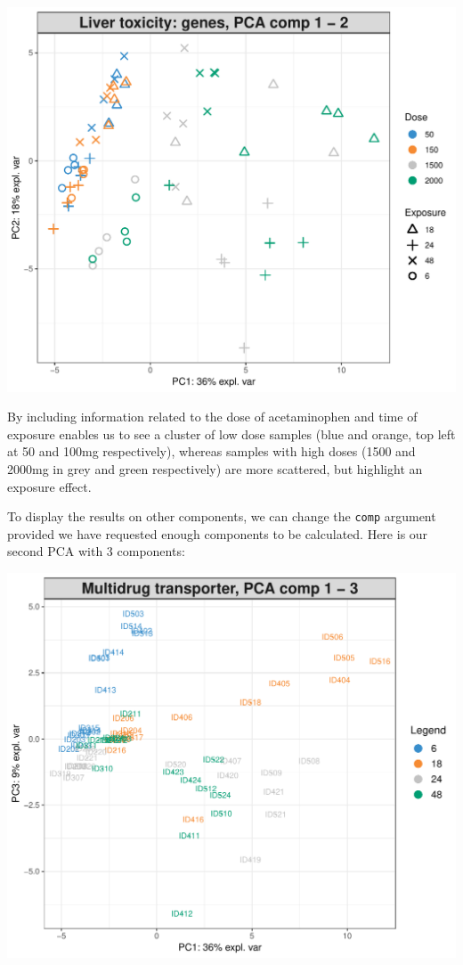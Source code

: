 \documentclass[]{book}
\newenvironment{Shaded}{\begin{snugshade}}{\end{snugshade}}
\newcommand{\DataTypeTok}[1]{\textcolor[rgb]{0.13,0.29,0.53}{#1}}
\newcommand{\DecValTok}[1]{\textcolor[rgb]{0.00,0.00,0.81}{#1}}
\newcommand{\KeywordTok}[1]{\textcolor[rgb]{0.13,0.29,0.53}{\textbf{#1}}}
\newcommand{\NormalTok}[1]{#1}
\newcommand{\OperatorTok}[1]{\textcolor[rgb]{0.81,0.36,0.00}{\textbf{#1}}}
\newcommand{\OtherTok}[1]{\textcolor[rgb]{0.56,0.35,0.01}{#1}}
\newcommand{\StringTok}[1]{\textcolor[rgb]{0.31,0.60,0.02}{#1}}
\begin{document}
\begin{center}\includegraphics[width=0.5\linewidth,]{Figures/03-pca-liver-1-plot-1} \end{center}

By including information related to the dose of acetaminophen and time of exposure enables us to see a cluster of low dose samples (blue and orange, top left at 50 and 100mg respectively), whereas samples with high doses (1500 and 2000mg in grey and green respectively) are more scattered, but highlight an exposure effect.

To display the results on other components, we can change the \texttt{comp} argument provided we have requested enough components to be calculated. Here is our second PCA with 3 components:

\begin{Shaded}
\end{Shaded}

\begin{center}\includegraphics[width=0.5\linewidth,]{Figures/03-pca-liver-2-1} \end{center}
\end{document}
